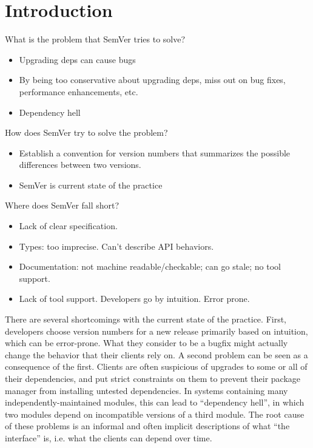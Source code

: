 \section{Introduction}

What is the problem that SemVer tries to solve? 
\begin{itemize}
\item Upgrading deps can cause bugs
\item By being too conservative about upgrading deps, miss out on
  bug fixes, performance enhancements, etc.
\item Dependency hell
\end{itemize}

How does SemVer try to solve the problem?
\begin{itemize}
\item Establish a convention for version numbers that summarizes
  the possible differences between two versions.
\item SemVer is current state of the practice
\end{itemize}

Where does SemVer fall short? 
\begin{itemize}
\item Lack of clear specification. 
\item Types: too imprecise. Can't describe API behaviors.
\item Documentation: not machine readable/checkable; can go stale; no tool support.
\item Lack of tool support. Developers go by intuition. Error prone.
\end{itemize}

There are several shortcomings with the current state of the practice.
%
First, developers choose version numbers for a new release primarily
based on intuition, which can be error-prone. What they consider to be
a bugfix might actually change the behavior that their clients rely
on.
%
A second problem can be seen as a consequence of the first. Clients
are often suspicious of upgrades to some or all of their dependencies,
and put strict constraints on them to prevent their package manager
from installing untested dependencies. 
%
In systems containing many independently-maintained modules, this can
lead to ``dependency hell''\cite{hell}, in which two modules depend on
incompatible versions of a third module. 
%
The root cause of these problems is an informal and often implicit
descriptions of what ``the interface'' is, i.e. what the clients can
depend over time.


